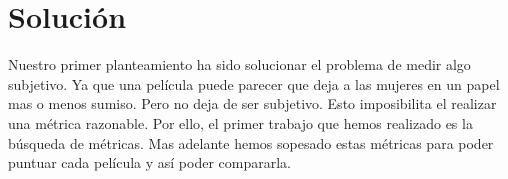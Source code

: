 \noindent %
\chapter{Solución}
    Nuestro primer planteamiento ha sido solucionar el problema de medir algo subjetivo. Ya que una película puede parecer que deja a las mujeres en un papel mas o menos sumiso. Pero no deja de ser subjetivo. Esto imposibilita el realizar una métrica razonable. Por ello, el primer trabajo que hemos realizado es la búsqueda de métricas. Mas adelante hemos sopesado estas métricas para poder puntuar cada película y así poder compararla.
